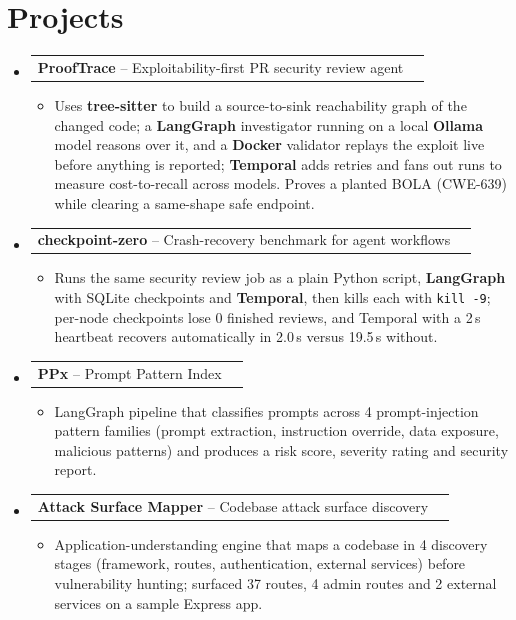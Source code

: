 \documentclass[a4paper,10pt]{article}
\makeatletter
\newcommand{\resumeItem}[1]{
  \item\small{
    {#1 \vspace{-2pt}}
  }
}
\newcommand{\resumeProjectHeading}[2]{
  \item
  \begin{tabular*}{0.97\textwidth}{l@{\extracolsep{\fill}}r}
    \small#1 & #2 \\
  \end{tabular*}\vspace{-7pt}
}
\newenvironment{resumeSubHeadingList}{\begin{itemize}[leftmargin=0.15in, label={}]}{\end{itemize}}
\newenvironment{resumeItemList}{\begin{itemize}}{\end{itemize}}
\makeatother
\begin{document}
\section{Projects}
\begin{resumeSubHeadingList}

  \resumeProjectHeading{\textbf{ProofTrace} -- Exploitability-first PR security review agent}{}
  \begin{resumeItemList}
    \resumeItem{Uses \textbf{tree-sitter} to build a source-to-sink reachability graph of the
                 changed code; a \textbf{LangGraph} investigator running on a local
                 \textbf{Ollama} model reasons over it, and a \textbf{Docker} validator replays the
                 exploit live before anything is reported; \textbf{Temporal} adds retries
                 and fans out runs to measure cost-to-recall across models. Proves a
                 planted BOLA (CWE-639) while clearing a same-shape safe endpoint.}
  \end{resumeItemList}

  \resumeProjectHeading{\textbf{checkpoint-zero} -- Crash-recovery benchmark for agent workflows}{}
  \begin{resumeItemList}
    \resumeItem{Runs the same security review job as a plain Python script,
                 \textbf{LangGraph} with SQLite checkpoints and \textbf{Temporal}, then kills each
                 with \texttt{kill -9}; per-node checkpoints lose 0 finished reviews, and
                 Temporal with a 2\,s heartbeat recovers automatically in 2.0\,s versus
                 19.5\,s without.}
  \end{resumeItemList}

  \resumeProjectHeading{\textbf{PPx} -- Prompt Pattern Index}{}
  \begin{resumeItemList}
    \resumeItem{LangGraph pipeline that classifies prompts across 4
                 prompt-injection pattern families (prompt extraction,
                 instruction override, data exposure, malicious patterns) and
                 produces a risk score, severity rating and security report.}
  \end{resumeItemList}

  \resumeProjectHeading{\textbf{Attack Surface Mapper} -- Codebase attack surface discovery}{}
  \begin{resumeItemList}
    \resumeItem{Application-understanding engine that maps a codebase in 4
                 discovery stages (framework, routes, authentication, external
                 services) before vulnerability hunting; surfaced 37 routes, 4
                 admin routes and 2 external services on a sample Express app.}
  \end{resumeItemList}

\end{resumeSubHeadingList}
\end{document}
